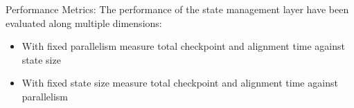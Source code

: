 

\par{Performance Metrics:} The performance of the state management layer have been evaluated along multiple dimensions:
\begin{itemize}
    \item With fixed parallelism measure total checkpoint and alignment time against state size
    \item With fixed state size measure total checkpoint and alignment time against parallelism
\end{itemize}


